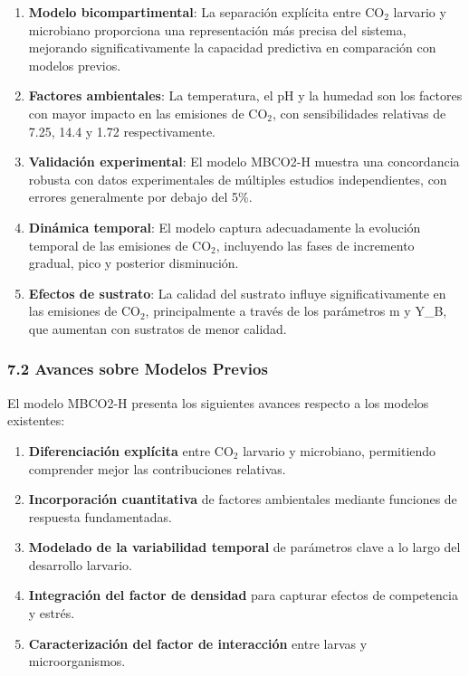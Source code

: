 \documentclass[
]{article}
\begin{document}
\begin{enumerate}
\def\labelenumi{\arabic{enumi}.}
\item
  \textbf{Modelo bicompartimental}: La separación explícita entre CO$_2$
  larvario y microbiano proporciona una representación más precisa del
  sistema, mejorando significativamente la capacidad predictiva en
  comparación con modelos previos.
\item
  \textbf{Factores ambientales}: La temperatura, el pH y la humedad son
  los factores con mayor impacto en las emisiones de CO$_2$, con
  sensibilidades relativas de 7.25, 14.4 y 1.72 respectivamente.
\item
  \textbf{Validación experimental}: El modelo MBCO2-H muestra una
  concordancia robusta con datos experimentales de múltiples estudios
  independientes, con errores generalmente por debajo del 5\%.
\item
  \textbf{Dinámica temporal}: El modelo captura adecuadamente la
  evolución temporal de las emisiones de CO$_2$, incluyendo las fases de
  incremento gradual, pico y posterior disminución.
\item
  \textbf{Efectos de sustrato}: La calidad del sustrato influye
  significativamente en las emisiones de CO$_2$, principalmente a través de
  los parámetros m y Y\_B, que aumentan con sustratos de menor calidad.
\end{enumerate}

\subsubsection{7.2 Avances sobre Modelos
Previos}\label{avances-sobre-modelos-previos}

El modelo MBCO2-H presenta los siguientes avances respecto a los modelos
existentes:

\begin{enumerate}
\def\labelenumi{\arabic{enumi}.}
\item
  \textbf{Diferenciación explícita} entre CO$_2$ larvario y microbiano,
  permitiendo comprender mejor las contribuciones relativas.
\item
  \textbf{Incorporación cuantitativa} de factores ambientales mediante
  funciones de respuesta fundamentadas.
\item
  \textbf{Modelado de la variabilidad temporal} de parámetros clave a lo
  largo del desarrollo larvario.
\item
  \textbf{Integración del factor de densidad} para capturar efectos de
  competencia y estrés.
\item
  \textbf{Caracterización del factor de interacción} entre larvas y
  microorganismos.
\end{enumerate}
\end{document}
